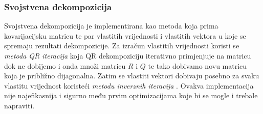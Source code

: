 \documentclass[zavrsnirad]{fer}
\begin{document}
\subsubsection{Svojstvena dekompozicija}
\label{sek:svojstvena_dekompozicija}
Svojstvena dekompozicija je implementirana kao metoda koja prima
kovarijacijsku matricu te par vlastitih vrijednosti i vlastitih vektora u koje
se spremaju rezultati dekompozicije.
Za izračun vlastitih vrijednosti koristi se \emph{metoda QR iteracija}
\cite{NLA} koja QR dekompoziciju
iterativno primjenjuje na matricu dok ne dobijemo i onda množi
matricu $R$ i $Q$ te tako dobivamo novu matricu koja je
približno dijagonalna. Zatim se vlastiti vektori dobivaju
posebno za svaku vlastitu vrijednost koristeći \emph{metodu
inverznih iteracija} \cite{NLA}. Ovakva implementacija nije
najefikasnija i sigurno među prvim optimizacijama koje bi se mogle
i trebale napraviti.
\end{document}
